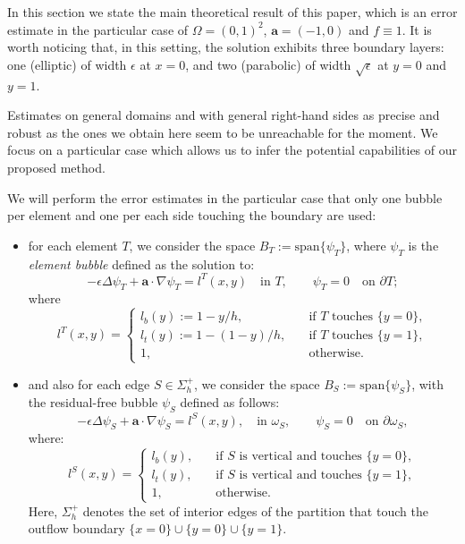 \documentclass{article}
\newcommand{\aaa}{\ensuremath{\mathbf{a}}\xspace}
\newcommand{\Span}{\text{span}}
\newcommand{\bT}[1][{}]{\ensuremath{\psi_T^{#1}}}
\newcommand{\bS}[1][{}]{\psi_S^{#1}}
\newcommand{\patchS}[1][{}]{\omega_S^{#1}}
\begin{document}
In this section we state the main theoretical result of this paper,
which is an error estimate in the particular case of $\Omega = (0,1)^2$, $\aaa = (-1,0)$ and $f \equiv 1$.
It is worth noticing that, in this setting, the solution exhibits three boundary layers: one (elliptic) of width $\epsilon$ at $x=0$, and two (parabolic) of width $\sqrt{\epsilon}$ at $y=0$ and $y=1$.

Estimates on general domains and with general right-hand sides as precise and robust as the ones we obtain here seem to be unreachable for the moment.
We focus on a particular case which allows us to infer the potential capabilities of our proposed method.

We will perform the error estimates in the particular case that only one bubble per element and one per each side touching the boundary are used:
\begin{itemize}
\item for each element $T$, we consider the space $B_T := \Span\{\bT
\}$, where $\bT$ is the \emph{element bubble} defined as the solution to:
\[
-\epsilon \Delta \bT + \aaa \cdot \nabla \bT
= l^T(x,y) 
\quad\text{in $T$}, 
\qquad 
\bT = 0 
\quad\text{on $\partial T$};
\] 
where
\begin{equation}\label{def:l_b-l_tT}
l^T(x,y) = \begin{cases}
    l_b(y):=1-y/h, \quad&\text{if $T$ touches $\{y=0\}$},
    \\
    l_t(y):=1-(1-y)/h,  \quad&\text{if $T$ touches $\{y=1\}$},
    \\
    1, \quad&\text{otherwise}.
\end{cases}
\end{equation}


\item and also for each edge $S\in\Sigma_h^+$, we consider the space $B_S := \Span\{\bS\}$, with the residual-free bubble $\bS$ defined as follows:
\[
-\epsilon \Delta \bS + \aaa \cdot \nabla \bS = l^S(x,y), 
\quad\text{in $\patchS$}, 
\qquad 
\bS = 0 \quad\text{on $\partial\patchS$},
\]
where:
\begin{equation}\label{def:l_b-l_tS}
l^S(x,y) = \begin{cases}
    l_b(y), \quad&\text{if $S$ is vertical and touches $\{y=0\}$},
    \\
    l_t(y),  \quad&\text{if $S$ is vertical and touches $\{y=1\}$},
    \\
    1, \quad&\text{otherwise}.
\end{cases}
\end{equation}
Here, $\Sigma_h^+$ denotes the set of interior edges of the partition that touch the outflow boundary $\{x=0\}\cup\{y=0\}\cup \{y=1\}$. 
\end{itemize}
\end{document}
